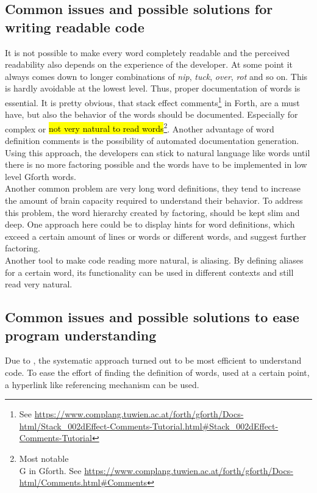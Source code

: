 \subsection{Common issues and possible solutions for writing readable code}

It is not possible to make every word completely readable and the perceived readability also depends on the experience of the developer. At some point  it always comes down to longer combinations of \emph{nip}, \emph{tuck}, \emph{over}, \emph{rot} and so on. This is hardly avoidable at the lowest level. Thus, proper documentation of words is essential. It is pretty obvious, that stack effect comments\footnote{See \url{https://www.complang.tuwien.ac.at/forth/gforth/Docs-html/Stack\_002dEffect-Comments-Tutorial.html\#Stack\_002dEffect-Comments-Tutorial}} in Forth, are a must have, but also the behavior of the words should be documented. Especially for complex or \hl{not very natural to read words}\footnote{Most notable \\G in Gforth. See \url{https://www.complang.tuwien.ac.at/forth/gforth/Docs-html/Comments.html\#Comments}}. Another advantage of word definition comments is the possibility of automated documentation generation.\\
Using this approach, the developers can stick to natural language like words until there is no more factoring possible and the words have to be implemented in low level Gforth words.
\\
Another common problem are very long word definitions, they tend to increase the amount of brain capacity required to understand their behavior. To address this problem, the word hierarchy created by factoring, should be kept slim and deep. One approach here could be to display hints for word definitions, which exceed a certain amount of lines or words or different words, and suggest further factoring.
\\
Another tool to make code reading more natural, is aliasing. By defining aliases for a certain word, its functionality can be used in different contexts and still read very natural.

\subsection{Common issues and possible solutions to ease program understanding}

Due to \cite{Robillard:2004:EDI:1042203.1042417}, the systematic approach turned out to be most efficient to understand code. To ease the effort of finding the definition of words, used at a certain point, a hyperlink like referencing mechanism can be used.

